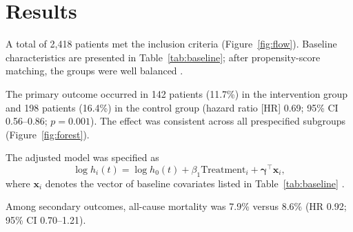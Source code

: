 \section{Results}
\label{sec:results}

A total of 2,418 patients met the inclusion criteria (Figure~\ref{fig:flow}). Baseline characteristics are presented in Table~\ref{tab:baseline}; after propensity-score matching, the groups were well balanced \cite{austin2011introduction}.

The primary outcome occurred in 142 patients (11.7\%) in the intervention group and 198 patients (16.4\%) in the control group (hazard ratio [HR] 0.69; 95\% CI 0.56--0.86; $p = 0.001$). The effect was consistent across all prespecified subgroups (Figure~\ref{fig:forest}).

The adjusted model was specified as
\begin{equation}
  \log h_i(t) = \log h_0(t) + \beta_1 \text{Treatment}_i + \boldsymbol{\gamma}^\top \mathbf{x}_i ,
  \label{eq:cox}
\end{equation}
where $\mathbf{x}_i$ denotes the vector of baseline covariates listed in Table~\ref{tab:baseline} \cite{cox1972regression, therneau2000modeling}.

Among secondary outcomes, all-cause mortality was 7.9\% versus 8.6\% (HR 0.92; 95\% CI 0.70--1.21).

